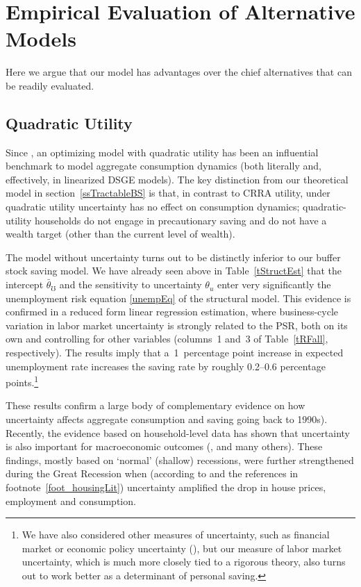 \documentclass[titlepage]{\econtex}
\begin{document}
\hypertarget{sReducedFormRegressions}{}

\section{Empirical Evaluation of Alternative Models} \label{sReducedFormRegressions}

Here we argue that our model has advantages over the chief alternatives that can be readily evaluated.

\hypertarget{Quadratic-Utility}{}

\subsection{Quadratic Utility} \label{sec:Quadratic}

Since \cite{hallRandomWalk}, an optimizing model with quadratic utility has been an influential benchmark to model aggregate consumption dynamics (both literally and, effectively, in linearized DSGE models). The key distinction from our theoretical model in section~\ref{ssTractableBS} is that, in contrast to CRRA utility, under quadratic utility uncertainty has no effect on consumption dynamics; quadratic-utility households do not engage in precautionary saving and do not have a wealth target (other than the current level of wealth).

The model without uncertainty turns out to be distinctly inferior to our buffer stock saving model.  We have already seen above in Table~\ref{tStructEst} that the intercept $\bar{\theta}_\mho$ and the sensitivity to uncertainty $\theta_u$ enter very significantly the  unemployment risk equation \eqref{unempEq} of the structural model.  This evidence is confirmed in a reduced form linear regression estimation, where business-cycle variation in labor market uncertainty is strongly related to the PSR, both on its own and controlling for other variables (columns~1 and~3 of Table~\ref{tRFall}, respectively). The results imply that a~1~percentage point increase in expected unemployment rate increases the saving rate by roughly 0.2--0.6 percentage points.\footnote{We have also considered other measures of uncertainty, such as financial market or economic policy uncertainty (\cite{bbdUncertainty}), but our measure of labor market uncertainty, which is much more closely tied to a rigorous theory, also turns out to work better as a determinant of personal saving.}

These results confirm a large body of complementary evidence on how uncertainty affects aggregate consumption and saving going back to 1990s). Recently, the evidence based on household-level data has shown that uncertainty is also important for macroeconomic outcomes (\cite{bfjstUncertain}, \cite{kv_microMacro} and many others). These findings, mostly based on `normal' (shallow) recessions,  were further strengthened during the Great Recession when (according to \cite{kmpHandbook} and the references in footnote~\ref{foot_housingLit}) uncertainty amplified the drop in house prices, employment and consumption.
\end{document}
